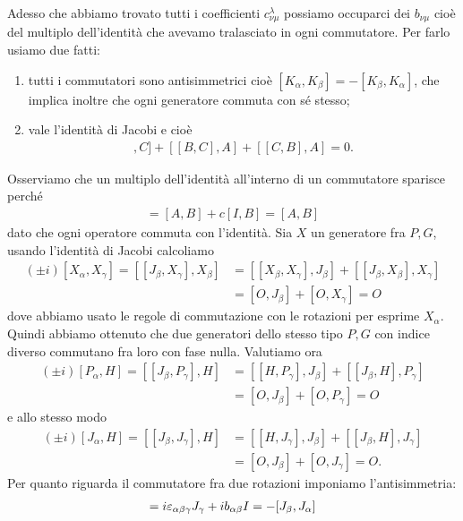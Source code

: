 Adesso che abbiamo trovato tutti i coefficienti $ c_{\nu \mu}^\lambda $ possiamo occuparci dei $ b_{\nu \mu} $ cioè del multiplo dell'identità che avevamo 
tralasciato in ogni commutatore. Per farlo usiamo due fatti:
\begin{enumerate}
  \item tutti i commutatori sono antisimmetrici cioè $ [K_\alpha, K_\beta] = - [K_\beta, K_\alpha ] $, che implica inoltre che ogni generatore commuta con 
  sé stesso;
  \item vale l'identità di Jacobi e cioè 
  \begin{align*}
    [[A,B], C] + [[B,C],A] + [[C, B],A] = 0.
  \end{align*}
\end{enumerate}
Osserviamo che un multiplo dell'identità all'interno di un commutatore sparisce perché
\begin{align*}
  [A + c I, B] = [A, B] + c [I, B] = [A, B]
\end{align*}
dato che ogni operatore commuta con l'identità. Sia $ X $ un generatore fra $ P, G $, usando l'identità di Jacobi calcoliamo 
\begin{align*}
  (\pm i)[X_\alpha, X_\gamma] = [[J_\beta, X_\gamma], X_\beta] &= [[X_\beta, X_\gamma], J_\beta] + [[J_\beta, X_\beta], X_\gamma]
  \\
  &= [O, J_\beta] + [O, X_\gamma] = O
\end{align*} 
dove abbiamo usato le regole di commutazione con le rotazioni per esprime $ X_\alpha $. Quindi abbiamo ottenuto che due generatori dello stesso tipo 
$ P, G $ con indice diverso commutano fra loro con fase nulla. Valutiamo ora 
\begin{align*}
  (\pm i)[P_\alpha, H] = [[J_\beta, P_\gamma], H] &= [[H, P_\gamma], J_\beta] + [[J_\beta, H], P_\gamma]
  \\
  &= [O, J_\beta] + [O, P_\gamma] = O
\end{align*}
e allo stesso modo 
\begin{align*}
  (\pm i)[J_\alpha, H] = [[J_\beta, J_\gamma], H] &= [[H, J_\gamma], J_\beta] + [[J_\beta, H], J_\gamma]
  \\
  &= [O, J_\beta] + [O, J_\gamma] = O.
\end{align*}
Per quanto riguarda il commutatore fra due rotazioni imponiamo l'antisimmetria:
\begin{align*}
  [J_\alpha, J_\beta] = i \eps_{\alpha \beta \gamma} J_\gamma + i b_{\alpha \beta} I = -[J_\beta, J_\alpha]
\end{align*}
